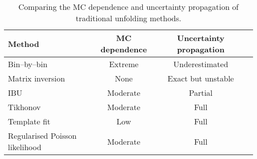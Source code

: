 \begin{table}
    \label{tab:binned-comp}
    \centering
    \begin{tabular}{lccc}
        \hline
        Method & MC dependence & Uncertainty propagation \\
        \hline
        Bin--by--bin & Extreme & Underestimated \\
        Matrix inversion & None & Exact but unstable \\
        IBU  & Moderate & Partial \\
        Tikhonov & Moderate & Full \\
        Template fit & Low & Full \\
        Regularised Poisson likelihood & Moderate & Full\\
        \hline
    \end{tabular}
    \caption{Comparing the MC dependence and uncertainty propagation of traditional unfolding methods.}
\end{table}

